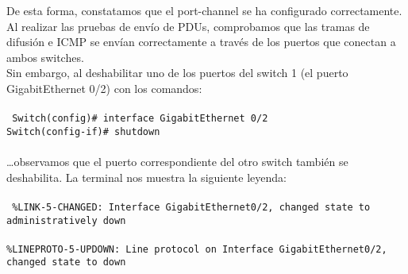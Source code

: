 \documentclass{article}
\begin{document}
De esta forma, constatamos que el port-channel se ha configurado correctamente. \\

Al realizar las pruebas de envío de PDUs, comprobamos que las tramas de difusión e ICMP se envían correctamente a través de los puertos que conectan a ambos switches. \\

Sin embargo, al deshabilitar uno de los puertos del switch 1 (el puerto GigabitEthernet 0/2) con los comandos: \\\\
\texttt{
    Switch(config)\# interface GigabitEthernet 0/2 \\
    Switch(config-if)\# shutdown \\
} \\

\ldots observamos que el puerto correspondiente del otro switch también se deshabilita. La terminal nos muestra la siguiente leyenda: \\\\
\texttt{
    \%LINK-5-CHANGED: Interface GigabitEthernet0/2, changed state to administratively down \\\\
    \%LINEPROTO-5-UPDOWN: Line protocol on Interface GigabitEthernet0/2, changed state to down \\\\
}
\end{document}
